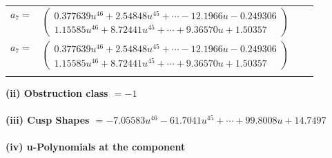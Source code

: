 \documentclass[1p]{elsarticle_modified}
\theoremstyle{definition}
\begin{document}
\begin{tabular}{m{7pt} m{180pt} m{7pt} m{180pt} }
\flushright $a_{7}=$&$\begin{pmatrix}0.377639 u^{46}+2.54848 u^{45}+\cdots-12.1966 u-0.249306\\1.15585 u^{46}+8.72441 u^{45}+\cdots+9.36570 u+1.50357\end{pmatrix}$\\ \flushright $a_{7}=$&$\begin{pmatrix}0.377639 u^{46}+2.54848 u^{45}+\cdots-12.1966 u-0.249306\\1.15585 u^{46}+8.72441 u^{45}+\cdots+9.36570 u+1.50357\end{pmatrix}$\\&\end{tabular}
\flushleft \textbf{(ii) Obstruction class $= -1$}\\~\\
\flushleft \textbf{(iii) Cusp Shapes $= -7.05583 u^{46}-61.7041 u^{45}+\cdots+99.8008 u+14.7497$}\\~\\
\newpage\renewcommand{\arraystretch}{1}
\flushleft \textbf{(iv) u-Polynomials at the component}\newline \\
\end{document}
